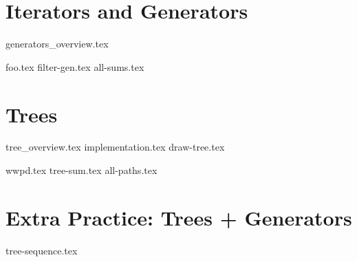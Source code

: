 \documentclass{exam}
\begin{document}
\section{Iterators and Generators}
{generators_overview.tex}
\begin{questions}
	{foo.tex}
	{filter-gen.tex}
	{all-sums.tex}
\end{questions}
\newpage
\section{Trees}
{tree_overview.tex}
{implementation.tex}
{draw-tree.tex}
\begin{questions}
{wwpd.tex}
{tree-sum.tex}
{all-paths.tex}
\end{questions}

\newpage
\section{Extra Practice: Trees + Generators}
\begin{questions}
	{tree-sequence.tex}
\end{questions}
\end{document}
